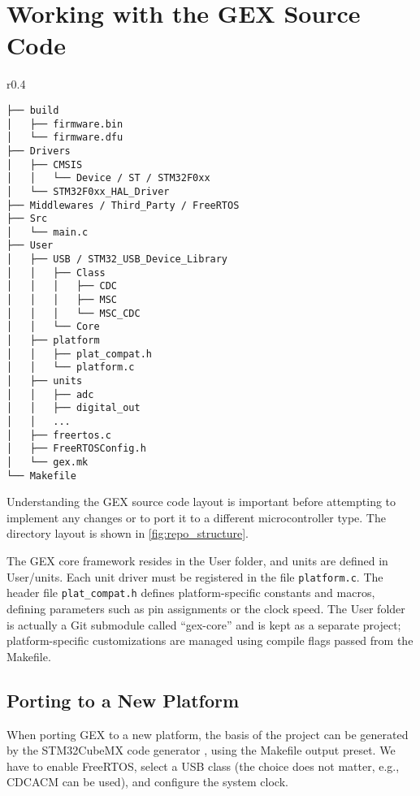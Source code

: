 \chapter{Working with the GEX Source Code}

\begin{wrapfigure}[21]{r}{0.4\textwidth}
	\scriptsize\vspace{-3em}
	\begin{verbatim}
├── build
│   ├── firmware.bin
│   └── firmware.dfu
├── Drivers
│   ├── CMSIS
│   │   └── Device / ST / STM32F0xx
│   └── STM32F0xx_HAL_Driver
├── Middlewares / Third_Party / FreeRTOS
├── Src
│   └── main.c
├── User
│   ├── USB / STM32_USB_Device_Library
│   │   ├── Class
│   │   │   ├── CDC
│   │   │   ├── MSC
│   │   │   └── MSC_CDC
│   │   └── Core
│   ├── platform
│   │   ├── plat_compat.h
│   │   └── platform.c
│   ├── units
│   │   ├── adc
│   │   ├── digital_out
│   │   ...
│   ├── freertos.c
│   ├── FreeRTOSConfig.h
│   └── gex.mk
└── Makefile
	\end{verbatim}
	\vspace{-1em}
	\caption{\label{fig:repo_structure} The general structure of the source code repository}
\end{wrapfigure}

Understanding the GEX source code layout is important before attempting to implement any changes or to port it to a different microcontroller type. The directory layout is shown in \cref{fig:repo_structure}. 

The GEX core framework resides in the User folder, and units are defined in User/units. Each unit driver must be registered in the file \verb|platform.c|. The header file \verb|plat_compat.h| defines platform-specific constants and macros, defining parameters such as pin assignments or the clock speed. The User folder is actually a Git submodule called ``gex-core'' and is kept as a separate project; platform-specific customizations are managed using compile flags passed from the Makefile.

\section{Porting to a New Platform}

When porting GEX to a new platform, the basis of the project can be generated by the STM32CubeMX code generator \cite{cubemx}, using the Makefile output preset. We have to enable FreeRTOS, select a USB class (the choice does not matter, e.g., \gls{CDCACM} can be used), and configure the system clock. 

